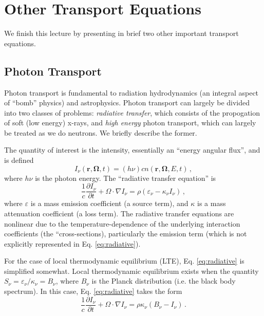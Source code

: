 \section*{Other Transport Equations}

We finish this lecture by presenting in brief two other important transport equations.

\subsection*{Photon Transport}

Photon transport is fundamental to radiation hydrodynamics (an integral aspect of ``bomb'' physics) and astrophysics.  Photon transport can largely be divided into two classes of problems: \textit{radiative transfer}, which consists of the propogation of soft (low energy) x-rays, and \textit{high energy} photon transport, which can largely be treated as we do neutrons.  We briefly describe the former.

The quantity of interest is the intensity, essentially an ``energy angular flux'', and is defined
\begin{equation}
 I_{\nu}(\mathbf{r},\mathbf{\Omega},t) = (h\nu)cn(\mathbf{r},\mathbf{\Omega},E,t) \, ,
\end{equation}
where $h\nu$ is the photon energy.  The ``radiative transfer equation'' is
\begin{equation}
 \frac{1}{c}\frac{\partial I_{\nu}}{\partial t} + \Omega \cdot \nabla I_{\nu} = \rho(\varepsilon_{\nu} - \kappa_{\nu}I_{\nu}) \, ,
 \label{eq:radiative}
\end{equation}
where $\varepsilon$ is a mass emission coefficient (a source term), and $\kappa$ is a mass attenuation coefficient (a loss term).  The radiative transfer equations are nonlinear due to the temperature-dependence of the underlying interaction coefficients (the ``cross-sections), particularly the emission term (which is not explicitly represented in Eq. \ref{eq:radiative}).

For the case of local thermodynamic equilibrium (LTE), Eq. \ref{eq:radiative} is simplified somewhat.  Local thermodynamic equilibrium exists when the quantity $S_{\nu} = \varepsilon_{\nu}/\kappa_{\nu} = B_{\nu}$, where $B_{\nu}$ is the Planck distribution (i.e. the black body spectrum).  In this case, Eq. \ref{eq:radiative} takes the form
\begin{equation}
 \frac{1}{c}\frac{\partial I_{\nu}}{\partial t} + \Omega \cdot \nabla I_{\nu} = \rho \kappa_{\nu} (B_{\nu} - I_{\nu}) \, .
 \label{eq:radiativelte}
\end{equation}

